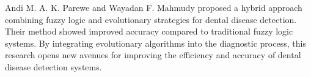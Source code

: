 Andi M. A. K. Parewe and Wayadan F. Mahmudy proposed a hybrid approach combining fuzzy logic and evolutionary strategies for dental disease detection\cite{parewe2018dental}. Their method showed improved accuracy compared to traditional fuzzy logic systems. By integrating evolutionary algorithms into the diagnostic process, this research opens new avenues for improving the efficiency and accuracy of dental disease detection systems.
